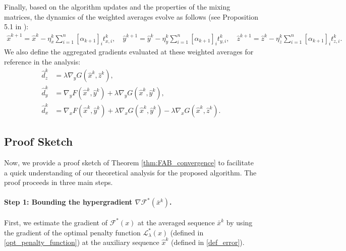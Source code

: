 \documentclass{article}
\theoremstyle{plain}
\theoremstyle{definition}
\theoremstyle{remark}
\begin{document}
Finally, based on the algorithm updates and the properties of the mixing matrices, the dynamics of the weighted averages evolve as follows (see Proposition 5.1 in \citealp{Nedic2025tvd}):
\begin{align}\label{eq:avg_dynamics}
    \hat{x}^{k+1} = \hat{x}^k - \eta_x^{k}\sum_{i=1}^n[\alpha_{k+1}]_i t_{x,i}^k, \quad
    \hat{y}^{k+1} = \hat{y}^k - \eta_y^{k}\sum_{i=1}^n[\alpha_{k+1}]_i t_{y,i}^k, \quad
    \hat{z}^{k+1} = \hat{z}^k - \eta_z^{k}\sum_{i=1}^n[\alpha_{k+1}]_i t_{z,i}^k.
\end{align}
We also define the aggregated gradients evaluated at these weighted averages for reference in the analysis:
\begin{subequations}\label{eq:global_gradients}
\begin{align}
    \hat{d}_{z}^{k} &= \lambda \nabla_{y} G(\hat{x}^k, \hat{z}^k), \label{globalgrad_z} \\
    \hat{d}_{y}^{k} &= \nabla_{y} F(\hat{x}^k, \hat{y}^k) + \lambda \nabla_{y} G(\hat{x}^k, \hat{y}^k), \label{globalgrad_y} \\
    \hat{d}_{x}^{k} &= \nabla_{x} F(\hat{x}^k, \hat{y}^k) + \lambda \nabla_{x} G(\hat{x}^k, \hat{y}^k) - \lambda \nabla_{x} G(\hat{x}^k, \hat{z}^k). \label{globalgrad_x}
\end{align}


\end{subequations}
\subsection{Proof Sketch} 
\label{app:fab_sketch}

Now, we provide a proof sketch of Theorem \ref{thm:FAB_convergence} to facilitate a quick understanding of our theoretical analysis for the proposed algorithm. The proof proceeds in three main steps. 

\paragraph{Step 1: Bounding the hypergradient $\nabla \mathcal{F}^*(\bar{x}^k)$.}
First, we estimate the gradient of  $\mathcal{F}^{*}(x)$ at the averaged sequence $\bar{x}^k$ by using the gradient of the optimal penalty function $\mathcal{L}_{\lambda}^{*}(x)$ (defined in \eqref{opt_penalty_function}) at the auxiliary sequence $\hat{x}^k$ (defined in \eqref{def_error}). 
\end{document}
